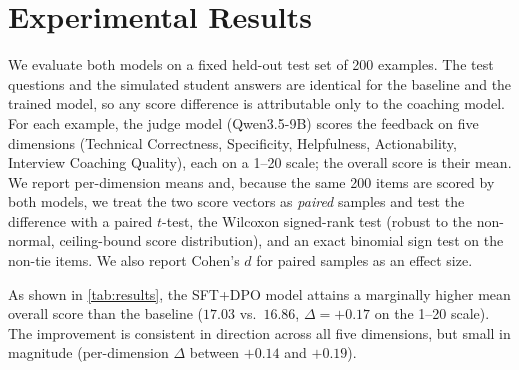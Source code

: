 %
%
%      
%
%

\section{Experimental Results}
\label{sec:results}

 We evaluate both models on a fixed held-out test
set of 200 examples. The test questions and the simulated student answers are
identical for the baseline and the trained model, so any score difference is
attributable only to the coaching model. For each example, the judge model
(Qwen3.5-9B) scores the feedback on five dimensions (Technical Correctness,
Specificity, Helpfulness, Actionability, Interview Coaching Quality), each on a
1--20 scale; the overall score is their mean. We report per-dimension means and,
because the same 200 items are scored by both models, we treat the two score
vectors as \emph{paired} samples and test the difference with a paired
$t$-test, the Wilcoxon signed-rank test (robust to the non-normal,
ceiling-bound score distribution), and an exact binomial sign test on the
non-tie items. We also report Cohen's $d$ for paired samples as an effect size.

 As shown in \cref{tab:results}, the SFT+DPO model
attains a marginally higher mean overall score than the baseline
($17.03$ vs.\ $16.86$, $\Delta=+0.17$ on the 1--20 scale). The improvement is
consistent in direction across all five dimensions, but small in magnitude
(per-dimension $\Delta$ between $+0.14$ and $+0.19$).

